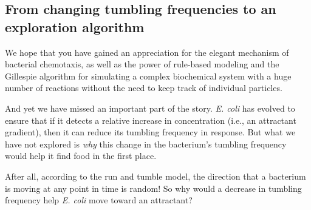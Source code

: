 %
%
%

\FloatBarrier
{}
\subsection{From changing tumbling frequencies to an exploration algorithm}

We hope that you have gained an appreciation for the elegant mechanism of bacterial chemotaxis, as well as the power of rule-based modeling and the Gillespie algorithm for simulating a complex biochemical system with a huge number of reactions without the need to keep track of individual particles.

And yet we have missed an important part of the story. \textit{E. coli} has evolved to ensure that if it detects a relative increase in concentration (i.e., an attractant gradient), then it can reduce its tumbling frequency in response. But what we have not explored is \textit{why} this change in the bacterium's tumbling frequency would help it find food in the first place.

After all, according to the run and tumble model, the direction that a bacterium is moving at any point in time is random! So why would a decrease in tumbling frequency help \textit{E. coli} move toward an attractant?

